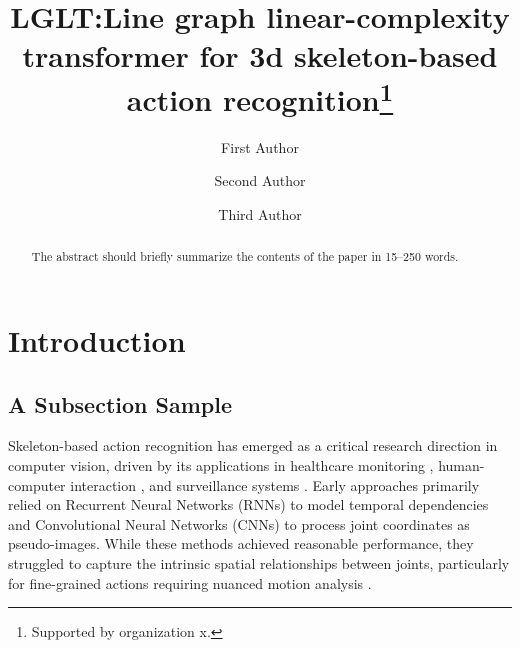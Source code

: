 \documentclass[runningheads]{llncs}
\begin{document}
%
\title{LGLT:Line graph linear-complexity transformer for 3d skeleton-based action recognition\thanks{Supported by organization x.}}
%
%
\author{First Author \and
Second Author \and
Third Author}
%
%
%
\maketitle              %
%
\begin{abstract}
The abstract should briefly summarize the contents of the paper in
15--250 words.

\end{abstract}
%
%
%
\section{Introduction}
\subsection{A Subsection Sample}

Skeleton-based action recognition has emerged as a critical research 
direction in computer vision, driven by its applications in healthcare 
monitoring \cite{ref1}, human-computer interaction \cite{ref2}, and surveillance systems \cite{ref3}.
Early approaches primarily relied on Recurrent Neural Networks (RNNs) \cite{ref4,ref5} 
to model temporal dependencies and Convolutional Neural Networks (CNNs) \cite{ref6}
to process joint coordinates as pseudo-images. While these methods achieved 
reasonable performance, they struggled to capture the intrinsic spatial 
relationships between joints, particularly for fine-grained actions 
requiring nuanced motion analysis \cite{ref7}.
\end{document}
